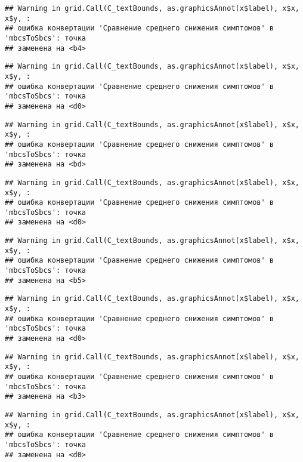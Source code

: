 \documentclass[
]{article}
\begin{document}
\begin{verbatim}
## Warning in grid.Call(C_textBounds, as.graphicsAnnot(x$label), x$x, x$y, :
## ошибка конвертации 'Сравнение среднего снижения симптомов' в 'mbcsToSbcs': точка
## заменена на <b4>
\end{verbatim}

\begin{verbatim}
## Warning in grid.Call(C_textBounds, as.graphicsAnnot(x$label), x$x, x$y, :
## ошибка конвертации 'Сравнение среднего снижения симптомов' в 'mbcsToSbcs': точка
## заменена на <d0>
\end{verbatim}

\begin{verbatim}
## Warning in grid.Call(C_textBounds, as.graphicsAnnot(x$label), x$x, x$y, :
## ошибка конвертации 'Сравнение среднего снижения симптомов' в 'mbcsToSbcs': точка
## заменена на <bd>
\end{verbatim}

\begin{verbatim}
## Warning in grid.Call(C_textBounds, as.graphicsAnnot(x$label), x$x, x$y, :
## ошибка конвертации 'Сравнение среднего снижения симптомов' в 'mbcsToSbcs': точка
## заменена на <d0>
\end{verbatim}

\begin{verbatim}
## Warning in grid.Call(C_textBounds, as.graphicsAnnot(x$label), x$x, x$y, :
## ошибка конвертации 'Сравнение среднего снижения симптомов' в 'mbcsToSbcs': точка
## заменена на <b5>
\end{verbatim}

\begin{verbatim}
## Warning in grid.Call(C_textBounds, as.graphicsAnnot(x$label), x$x, x$y, :
## ошибка конвертации 'Сравнение среднего снижения симптомов' в 'mbcsToSbcs': точка
## заменена на <d0>
\end{verbatim}

\begin{verbatim}
## Warning in grid.Call(C_textBounds, as.graphicsAnnot(x$label), x$x, x$y, :
## ошибка конвертации 'Сравнение среднего снижения симптомов' в 'mbcsToSbcs': точка
## заменена на <b3>
\end{verbatim}

\begin{verbatim}
## Warning in grid.Call(C_textBounds, as.graphicsAnnot(x$label), x$x, x$y, :
## ошибка конвертации 'Сравнение среднего снижения симптомов' в 'mbcsToSbcs': точка
## заменена на <d0>
\end{verbatim}
\end{document}
